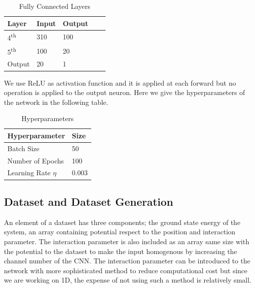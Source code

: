 \documentclass[a4paper,times,hidelinks,12pt]{article}
\begin{document}
\begin{table}[H]
    \centering
    \caption{Fully Connected Layers}
    \label{tb:fully_layers}
    \begin{tabular}{|l|l|l|l|l|} \hline
    \textbf{Layer}        & \textbf{Input}      & \textbf{Output}    \\ \hline
    4\textsuperscript{th} & 310                 & 100                \\ \hline
    5\textsuperscript{th} & 100                 & 20                 \\ \hline
    Output                & 20                  & 1                  \\ \hline
    \end{tabular}
\end{table}

We use ReLU as activation function and it is applied at each forward but no operation is applied to the output neuron. Here we give the hyperparameters of the network in the following table.

\begin{table}[H]
    \centering
    \caption{Hyperparameters}
    \label{tb:hyperparams}
    \begin{tabular}{|l|l|} \hline
    \textbf{Hyperparameter}  & \textbf{Size}  \\ \hline  
    Batch Size               & 50             \\ \hline
    Number of Epochs         & 100            \\ \hline
    Learning Rate $\eta$     & 0.003          \\ \hline
    \end{tabular}
\end{table}


\subsection{Dataset and Dataset Generation}

An element of a dataset has three components; the ground state energy of the system, an array containing potential respect to the position and interaction parameter. The interaction parameter is also included as an array same size with the potential to the dataset to make the input homogenous by increasing the channel number of the CNN. The interaction parameter can be introduced to the network with more sophisticated method to reduce computational cost but since we are working on 1D, the expense of not using such a method is relatively small.
\end{document}
